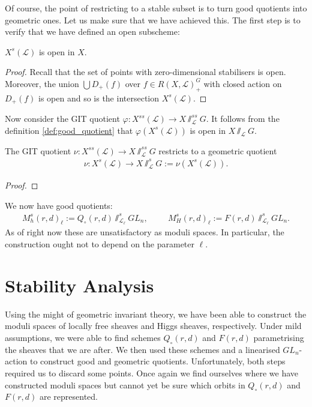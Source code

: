 \documentclass[12pt]{ociamthesis}  %
\begin{document}
Of course, the point of restricting to a stable subset is to turn
good quotients into geometric ones. Let us make sure that we have
achieved this. The first step is to verify that we have defined
an open subscheme:

\begin{lemma}
  $X^s(\mathscr L)$ is open in $X$.
  \begin{proof}
    Recall that the set of points with zero-dimensional stabilisers is open.
    Moreover, the union $\bigcup D_+(f)$ over $f\in R(X,\mathscr L)_+^G$
    with closed action on $D_+(f)$ is open and so is the intersection
    $X^s(\mathscr L)$.
  \end{proof}
\end{lemma}

Now consider the GIT quotient $\varphi : X^{ss}(\mathscr L)\to X\sslash^{ss}_{\mathscr L} G$.
It follows from the definition \ref{def:good_quotient} that
$\varphi(X^s(\mathscr L))$ is open in $X\sslash_{\mathscr L} G$.

\begin{theorem}
  The GIT quotient $\nu : X^{ss}({\mathscr L}) \to X\sslash^{ss}_{\mathscr L} G$
  restricts to a geometric quotient
  \begin{align*}
    \nu : X^s({\mathscr L}) \to X\sslash^s_{\mathscr L} G := \nu(X^s({\mathscr L})).
  \end{align*}
  \begin{proof}
    \missingproof
  \end{proof}
\end{theorem}

\begin{example}
  We now have good quotients:
  \begin{align*}
    M^{s}_h(r,d)_\ell := Q_\circ(r,d)\sslash^s_{\mathscr L_\ell} GL_n, \hspace{1cm}
    M^{s}_H(r,d)_\ell := F(r,d)\sslash^s_{\mathscr L_\ell} GL_n.
  \end{align*}
  As of right now these are unsatisfactory as moduli spaces. In particular,
  the construction ought not to depend on the parameter $\ell$.
\end{example}

\section{Stability Analysis}

Using the might of geometric invariant theory, we have been able
to construct the moduli spaces of locally free sheaves and Higgs
sheaves, respectively. Under mild assumptions, we were able to
find schemes $Q_\circ(r,d)$ and $F(r,d)$ parametrising the sheaves
that we are after. We then used these schemes and a linearised
$GL_n$-action to construct good and geometric quotients.
Unfortunately, both steps required us to discard some points.
Once again we find ourselves where we have constructed moduli spaces
but cannot yet be sure which orbits in $Q_\circ(r,d)$ and $F(r,d)$
are represented.
\end{document}
